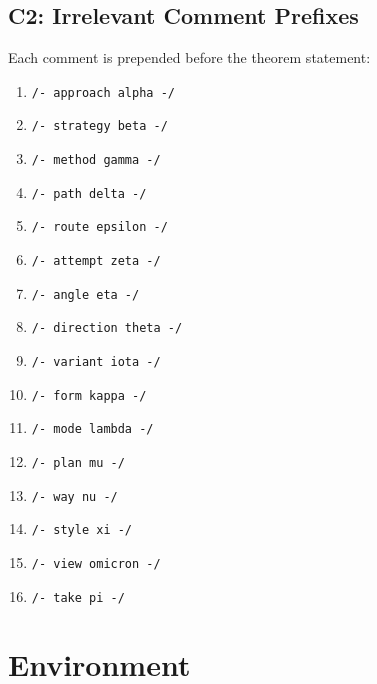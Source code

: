 \documentclass{article}
\begin{document}
\subsection{C2: Irrelevant Comment Prefixes}
Each comment is prepended before the theorem statement:
\begin{enumerate}
\item \texttt{/- approach alpha -/}
\item \texttt{/- strategy beta -/}
\item \texttt{/- method gamma -/}
\item \texttt{/- path delta -/}
\item \texttt{/- route epsilon -/}
\item \texttt{/- attempt zeta -/}
\item \texttt{/- angle eta -/}
\item \texttt{/- direction theta -/}
\item \texttt{/- variant iota -/}
\item \texttt{/- form kappa -/}
\item \texttt{/- mode lambda -/}
\item \texttt{/- plan mu -/}
\item \texttt{/- way nu -/}
\item \texttt{/- style xi -/}
\item \texttt{/- view omicron -/}
\item \texttt{/- take pi -/}
\end{enumerate}

\section{Environment}
\label{app:env}
\end{document}
